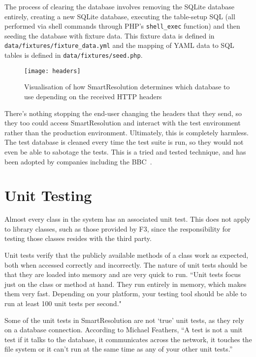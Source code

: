 The process of clearing the database involves removing the SQLite database entirely, creating a new SQLite database, executing the table-setup SQL (all performed via shell commands through PHP's \lstinline{shell_exec} function) and then seeding the database with fixture data. This fixture data is defined in \lstinline{data/fixtures/fixture_data.yml} and the mapping of YAML data to SQL tables is defined in \lstinline{data/fixtures/seed.php}.

\begin{figure}[h!]
  \centering
    \ifimages
    \texttt{[image: headers]}
    \fi
  \caption{Visualisation of how SmartResolution determines which database to use depending on the received HTTP headers}
  \label{uml:headers}
\end{figure}

There's nothing stopping the end-user changing the headers that they send, so they too could access SmartResolution and interact with the test environment rather than the production environment. Ultimately, this is completely harmless. The test database is cleaned every time the test suite is run, so they would not even be able to sabotage the tests. This is a tried and tested technique, and has been adopted by companies including the BBC~\cite{bbc:cucumber}.

\section{Unit Testing}

Almost every class in the system has an associated unit test. This does not apply to library classes, such as those provided by F3, since the responsibility for testing those classes resides with the third party.

Unit tests verify that the publicly available methods of a class work as expected, both when accessed correctly and incorrectly. The nature of unit tests should be that they are loaded into memory and are very quick to run. ``Unit tests focus just on the class or method at hand. They run entirely in memory, which makes them very fast. Depending on your platform, your testing tool should be able to run at least 100 unit tests per second."~\cite{artOfAgile}

Some of the unit tests in SmartResolution are not `true' unit tests, as they rely on a database connection. According to Michael Feathers, ``A test is not a unit test if it talks to the database, it communicates across the network, it touches the file system or it can't run at the same time as any of your other unit tests.''~\cite{feathers:unitTests}

